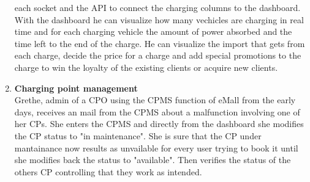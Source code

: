 \begin{enumerate}[label=\textbf{\Alph*}.]
            each socket and the API to connect the charging columns to the dashboard. With the dashboard he can visualize how many vechicles are charging in real time
            and for each charging vehicle the amount of power absorbed and the time left to the end of the charge. He can visualize the import that gets from each
            charge, decide the price for a charge and add special promotions to the charge to win the loyalty of the existing clients or acquire new clients.
      \item \textbf{Charging point management} \\
            Grethe, admin of a CPO using the CPMS function of eMall from the early days, receives an mail from the CPMS about a malfunction involving one of her CPs. 
            She enters the CPMS and directly from the dashboard she modifies the CP status to "in maintenance". 
            She is sure that the CP under mantainance now results as unvailable for every user trying to book it until she modifies back the status to "available". 
            Then verifies the status of the others CP controlling that they work as intended.
\end{enumerate}

